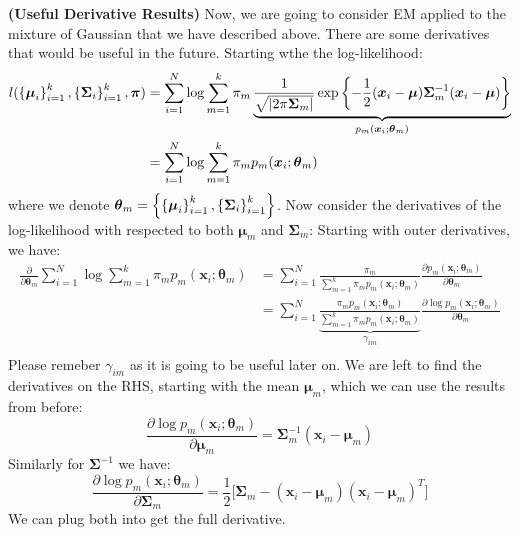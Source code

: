 \begin{remark}{\textbf{(Useful Derivative Results)}}
    Now, we are going to consider EM applied to the mixture of Gaussian that we have described above. There are some derivatives that would be useful in the future. Starting wthe the log-likelihood:
    \begin{equation*}
    \begin{aligned}    
        l(\left\{ \boldsymbol \mu_i \right\}^k_{i=1}, \left\{ \boldsymbol \Sigma_i \right\}^k_{i=1}, \boldsymbol \pi) &= \sum^N_{i=1}\log\sum^k_{m=1} \pi_m \underbrace{\frac{1}{\sqrt{\left| 2\pi\boldsymbol \Sigma_m \right|}}\exp\left\{ -\frac{1}{2}(\boldsymbol x_i-\boldsymbol \mu)\boldsymbol \Sigma_m^{-1}(\boldsymbol x_i-\boldsymbol \mu) \right\}}_{p_m(\boldsymbol x_i ; \boldsymbol \theta_m)}\\
        &= \sum^N_{i=1}\log\sum^k_{m=1}\pi_mp_m(\boldsymbol x_i ; \boldsymbol \theta_m)
    \end{aligned}
    \end{equation*} 
    where we denote $\boldsymbol \theta_m = \left\{ \left\{ \boldsymbol \mu_i \right\}^k_{i=1}, \left\{ \boldsymbol \Sigma_i \right\}^k_{i=1} \right\}$. Now consider the derivatives of the log-likelihood with respected to both $\boldsymbol \mu_m$ and $\boldsymbol\Sigma_m$: Starting with outer derivatives, we have:
    \begin{equation*}
    \begin{aligned} 
        \frac{\partial}{\partial\boldsymbol\theta_m}\sum^N_{i=1}\log\sum^k_{m=1}\pi_mp_m(\boldsymbol x_i ; \boldsymbol \theta_m) 
        &= \sum^N_{i=1}\frac{\pi_m}{\sum^k_{m=1}\pi_mp_m(\boldsymbol x_i ; \boldsymbol \theta_m)}\frac{\partial p_m(\boldsymbol x_i ; \boldsymbol \theta_m)}{\partial\boldsymbol\theta_m} \\
        &= \sum^N_{i=1}\underbrace{\frac{\pi_mp_m(\boldsymbol x_i ; \boldsymbol \theta_m)}{\sum^k_{m=1}\pi_mp_m(\boldsymbol x_i ; \boldsymbol \theta_m)} }_{\gamma_{im}}\frac{\partial \log p_m(\boldsymbol x_i ; \boldsymbol \theta_m)}{\partial\boldsymbol\theta_m} \\
    \end{aligned}
    \end{equation*}
    Please remeber $\gamma_{im}$ as it is going to be useful later on. We are left to find the derivatives on the RHS, starting with the mean $\boldsymbol \mu_m$, which we can use the results from before:
    \begin{equation*}
        \frac{\partial \log p_m(\boldsymbol x_i ; \boldsymbol \theta_m)}{\partial\boldsymbol\mu_m} = \boldsymbol \Sigma_m^{-1}(\boldsymbol x_i - \boldsymbol \mu_m)
    \end{equation*}
    Similarly for $\boldsymbol \Sigma^{-1}$ we have:
    \begin{equation*}
        \frac{\partial \log p_m(\boldsymbol x_i ; \boldsymbol \theta_m)}{\partial\boldsymbol\Sigma_m} = \frac{1}{2}\Big[\boldsymbol \Sigma_m - (\boldsymbol x_i - \boldsymbol \mu_m)(\boldsymbol x_i - \boldsymbol \mu_m)^T\Big]
    \end{equation*}
    We can plug both into get the full derivative.
\end{remark}

